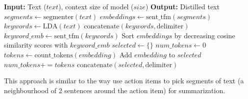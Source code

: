 		\begin{algorithm}
			\begin{algorithmic}
				\State \textbf{Input:} Text ($text$), context size of model ($size$)
				\State \textbf{Output:} Distilled text
				\State $segments \leftarrow \text{segmenter}(text)$
				\State $embeddings \leftarrow \text{sent\_tfm}(segments)$
				\State $keywords \leftarrow \text{LDA}(text)$
				\State $\text{concatenate}(keywords, \text{delimiter})$
				\State $keyword\_emb \leftarrow \text{sent\_tfm}(keywords)$
				\State Sort $embeddings$ by decreasing cosine similarity scores with $keyword\_emb$
				\State $selected \leftarrow \{\}$
				\State $num\_tokens \leftarrow 0$
					\State $tokens \leftarrow \text{count\_tokens}(embedding)$
						\State Add $embedding$ to $selected$
						\State $num\_tokens += tokens$
					\EndIf
				\EndFor
				\State $\text{concatenate}(selected, \text{delimiter})$
				\State {}
			\end{algorithmic}
		\end{algorithm}

		This approach is similar to the way \citet{golia2024action} use action items to pick segments
		of text (a neighbourhood of 2 sentences around the action item) for summarization.
